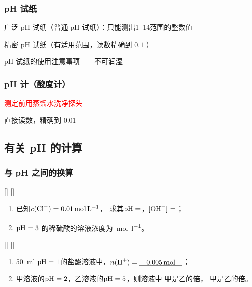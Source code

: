        \subsubsection{pH 试纸}\label{subsubsec:pH试纸}

            广泛 pH 试纸（普通 pH 试纸）：只能测出\numrange{1}{14}范围的整数值

            精密 pH 试纸（有适用范围，读数精确到 \( 0.1 \) ）

            pH 试纸的使用注意事项——不可润湿

        \subsubsection{pH 计（酸度计）}\label{subsubsec:pH计}
            \textcolor{red}{测定前用蒸馏水洗净探头}

            直接读数，精确到 \( 0.01 \)

    \subsection{有关 pH 的计算}\label{subsec:有关pH的计算}

        \subsubsection{\texorpdfstring{\cemh{[H+]}}{H⁺}与 pH 之间的换算}\label{subsubsec:[H+]与pH之间的换算}
            \begin{xmp}
                [pH 计算例一]
                {}
                []
                []
                \vspace{-\baselineskip}
                \begin{enumerate}[itemindent=0em]
                    \item 已知\(c(\cemh{Cl-}) = \SI{0.01}{\mole\per\litre}\)，
                求其\(\cemh{pH}=\)\uline{}，\(\cemh{[OH^-]}=\)\newline\uline{}；
                    \item \(\cemh{pH} = 3\) 的稀硫酸的溶液浓度为\uline{}\SI{}{\mole\per\litre}。
                \end{enumerate}
            \end{xmp}
            \begin{xmp}
                [pH 计算例二]
                {}
                []
                []
                \vspace{-\baselineskip}
                \begin{enumerate}
                    \item \SI{50}{\ml} \(\cemh{pH} = 1\)的盐酸溶液中，\( \conc[n]{H+} =\uline{\makebox[6em]{\SI{0.005}{\mole}}}\)；
                    \item 甲溶液的\(\cemh{pH} = 2\)，乙溶液的\(\cemh{pH} = 5\)，则溶液中 \cemh{[H+]} 甲是乙的\uline{}倍，\cemh{[OH^-]} 甲是乙的\uline{}倍。
                \end{enumerate}
            \end{xmp}
            
